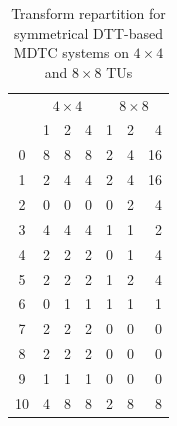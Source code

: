 \documentclass[11pt,a4paper,openright,twoside]{book}
\def\useINSAcover{0} %
\numberwithin{equation}{section} %
\numberwithin{figure}{section} %
\numberwithin{table}{section} %
\begin{document}
\begin{table}[h]
	\centering
	\small
	\def\arraystretch{0.85}
	\begin{tabular}{c|rrr|rrr}
		& \multicolumn{3}{c|}{$4\times4$} & \multicolumn{3}{c}{$8\times8$} \\
		\diagbox{\acs{IPM}}{System} & 1 & 2 & 4 & 1 & 2 & 4\\
		\hline
		0  & 8 & 8 & 8 & 2 & 4 & 16 \\
		1  & 2 & 4 & 4 & 2 & 4 & 16 \\
		2  & 0 & 0 & 0 & 0 & 2 & 4 \\
		3  & 4 & 4 & 4 & 1 & 1 & 2 \\
		4  & 2 & 2 & 2 & 0 & 1 & 4 \\
		5  & 2 & 2 & 2 & 1 & 2 & 4 \\
		6  & 0 & 1 & 1 & 1 & 1 & 1 \\
		7  & 2 & 2 & 2 & 0 & 0 & 0 \\
		8  & 2 & 2 & 2 & 0 & 0 & 0 \\
		9  & 1 & 1 & 1 & 0 & 0 & 0 \\
		10 & 4 & 8 & 8 & 2 & 8 & 8 \\
	\end{tabular}
	\caption{Transform repartition for symmetrical \acs{DTT}-based \acs{MDTC}
	systems on $4\times4$ and $8\times8$ \acsp{TU}}
	\label{tab:config_sym_dtt}
\end{table}

\backmatter



\printindex
\label{cha:index}
\thispagestyle{empty}

\ifthenelse{\useINSAcover = 1}
{\newpage
\thispagestyle{empty}
\mbox{}
}{}
\end{document}

